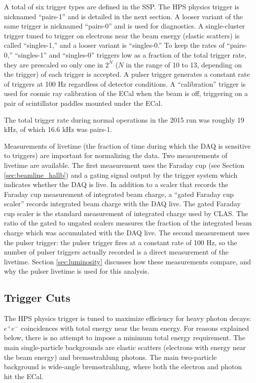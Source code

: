 A total of six trigger types are defined in the SSP.
The HPS physics trigger is nicknamed ``pairs-1'' and is detailed in the next section.
A looser variant of the same trigger is nicknamed ``pairs-0'' and is used for diagnostics.
A single-cluster trigger tuned to trigger on electrons near the beam energy (elastic scatters) is called ``singles-1,'' and a looser variant is ``singles-0.''
To keep the rates of ``pairs-0,'' ``singles-1'' and ``singles-0'' triggers low as a fraction of the total trigger rate, they are prescaled so only one in $2^N$ ($N$ in the range of 10 to 13, depending on the trigger) of each trigger is accepted.
A pulser trigger generates a constant rate of triggers at 100 Hz regardless of detector conditions.
A ``calibration'' trigger is used for cosmic ray calibration of the ECal when the beam is off, triggering on a pair of scintillator paddles mounted under the ECal.

The total trigger rate during normal operations in the 2015 run was roughly 19 kHz, of which 16.6 kHz was pairs-1.

Measurements of livetime (the fraction of time during which the DAQ is sensitive to triggers) are important for normalizing the data.
Two measurements of livetime are available.
The first measurement uses the Faraday cup (see Section \ref{sec:beamline_hallb}) and a gating signal output by the trigger system which indicates whether the DAQ is live.
In addition to a scaler that records the Faraday cup measurement of integrated beam charge, a ``gated Faraday cup scaler'' records integrated beam charge with the DAQ live.
The gated Faraday cup scaler is the standard measurement of integrated charge used by CLAS.
The ratio of the gated to ungated scalers measures the fraction of the integrated beam charge which was accumulated with the DAQ live.
The second measurement uses the pulser trigger: the pulser trigger fires at a constant rate of 100 Hz, so the number of pulser triggers actually recorded is a direct measurement of the livetime.
Section \ref{sec:luminosity} discusses how these measurements compare, and why the pulser livetime is used for this analysis.

\subsection{Trigger Cuts}
\label{sec:trigger_cuts}

The HPS physics trigger is tuned to maximize efficiency for heavy photon decays: $e^+e^-$ coincidences with total energy near the beam energy.
For reasons explained below, there is no attempt to impose a minimum total energy requirement.
The main single-particle backgrounds are elastic scatters (electrons with energy near the beam energy) and bremsstrahlung photons.
The main two-particle background is wide-angle bremsstrahlung, where both the electron and photon hit the ECal.

